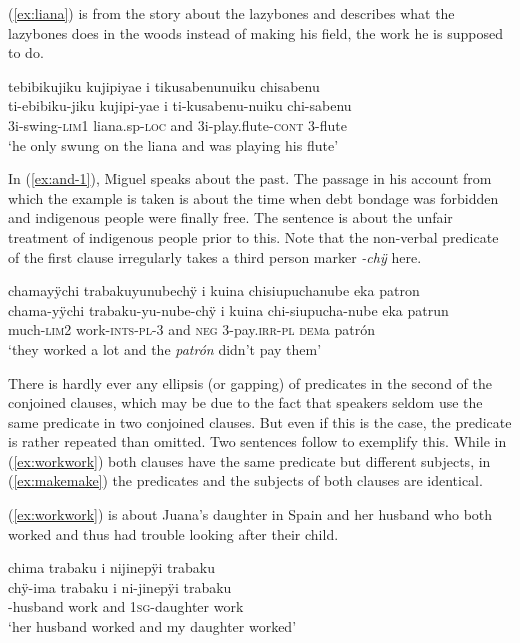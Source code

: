 (\ref{ex:liana}) is from the story about the lazybones and describes what the lazybones does in the woods instead of making his field, the work he is supposed to do.

\ea\label{ex:liana}
\begingl
\glpreamble tebibikujiku kujipiyae i tikusabenunuiku chisabenu\\
\gla ti-ebibiku-jiku kujipi-yae i ti-kusabenu-nuiku chi-sabenu\\
\glb 3i-swing-\textsc{lim}1 liana.sp-\textsc{loc} and 3i-play.flute-\textsc{cont} 3-flute\\
\glft ‘he only swung on the liana and was playing his flute’
\endgl
\trailingcitation{[mox-n110920l.048-049]}
\xe

In (\ref{ex:and-1}), Miguel speaks about the past. The passage in his account from which the example is taken is about the time when debt bondage was forbidden and indigenous people were finally free. The sentence is about the unfair treatment of indigenous people prior to this. Note that the non-verbal predicate of the first clause irregularly takes a third person marker \textit{-chÿ} here.

\ea\label{ex:and-1}
\begingl
\glpreamble chamayÿchi trabakuyunubechÿ i kuina chisiupuchanube eka patron\\
\gla chama-yÿchi trabaku-yu-nube-chÿ i kuina chi-siupucha-nube eka patrun\\
\glb much-\textsc{lim}2 work-\textsc{ints}-\textsc{pl}-3 and \textsc{neg} 3-pay.\textsc{irr}-\textsc{pl} \textsc{dem}a patrón\\
\glft ‘they worked a lot and the \textit{patrón} didn’t pay them’
\endgl
\trailingcitation{[mxx-p110825l.042]}
\xe


There is hardly ever any ellipsis (or gapping) of predicates in the second of the conjoined clauses, which may be due to the fact that speakers seldom use the same predicate in two conjoined clauses. But even if this is the case, the predicate is rather repeated than omitted. Two sentences follow to exemplify this. While in (\ref{ex:workwork}) both clauses have the same predicate but different subjects, in (\ref{ex:makemake}) the predicates and the subjects of both clauses are identical.

(\ref{ex:workwork}) is about Juana’s daughter in Spain and her husband who both worked and thus had trouble looking after their child.

\ea\label{ex:workwork}
\begingl
\glpreamble chima trabaku i nijinepÿi trabaku\\
\gla chÿ-ima trabaku i ni-jinepÿi trabaku\\
-husband work and 1\textsc{sg}-daughter work\\
\glft ‘her husband worked and my daughter worked’
\endgl
\trailingcitation{[jxx-p110923l-1.359]}
\xe

